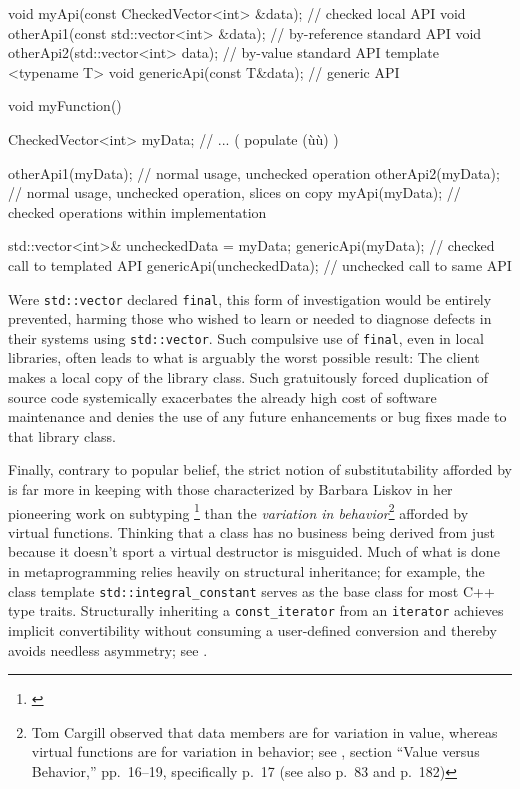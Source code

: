 {\begin{emcppslisting}[emcppsbatch=e8]
void myApi(const CheckedVector<int> &data);       // checked local API
void otherApi1(const std::vector<int> &data);     // by-reference standard API
void otherApi2(std::vector<int> data);            // by-value standard API
template <typename T>
void genericApi(const T&data);                    // generic API

void myFunction()
{
    CheckedVector<int> myData;
    // ...                  ( populate (ù{}ù) )

    otherApi1(myData);   // normal usage, unchecked operation
    otherApi2(myData);   // normal usage, unchecked operation, slices on copy
    myApi(myData);       // checked operations within implementation

    std::vector<int>&  uncheckedData = myData;
    genericApi(myData);        // checked call to templated API
    genericApi(uncheckedData); // unchecked call to same API
}
\end{emcppslisting}
    

\noindent Were \lstinline!std::vector! declared \lstinline!final!, this form of
investigation would be entirely prevented, harming those who wished to
learn or needed to diagnose defects in their systems using
\lstinline!std::vector!. Such compulsive use of \lstinline!final!, even in
local libraries, often leads to what is arguably the worst possible
result: The client makes a local copy of the library class. Such
gratuitously forced duplication of source code systemically exacerbates
the already high cost of software maintenance and denies the use of any
future enhancements or bug fixes made to that library class.

Finally, contrary to popular belief, the strict notion of
substitutability afforded by  is far more
in keeping with those characterized by Barbara Liskov in her pioneering
work on subtyping {\cprotect\footnote{\cite{liskov87}}} than the
\emph{variation in behavior}{\cprotect\footnote{Tom Cargill observed
that data members are for variation in value, whereas virtual
functions are for variation in behavior; see \cite{cargill92}, section ``Value versus
Behavior,'' pp.~16--19, specifically p.~17 (see also p.~83 and p.~182)}}
 afforded by virtual functions. Thinking that a
class has no business being derived from just because it doesn't sport a
virtual destructor is misguided. Much of what is done in metaprogramming
relies heavily on structural inheritance; for example, the class
template \lstinline!std::integral_constant! serves as the base class for
most C++ type traits. Structurally inheriting a \lstinline!const_iterator!
from an \lstinline!iterator! achieves implicit convertibility without
consuming a user-defined conversion and thereby avoids needless
asymmetry; see .

}
